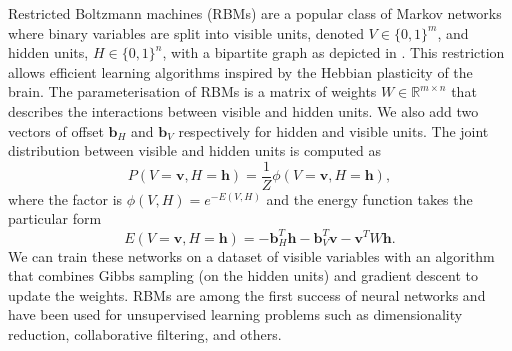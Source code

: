 Restricted Boltzmann machines (RBMs) are a popular class of Markov networks where binary variables are split into visible units, denoted $V \in \{0, 1\}^m$, and hidden units, $H \in \{0, 1\}^n$, with a bipartite graph as depicted in . This restriction allows efficient learning algorithms inspired by the Hebbian plasticity of the brain. The parameterisation of RBMs is a matrix of weights $W \in \mathbb{R}^{m\times n}$ that describes the interactions between visible and hidden units. We also add two vectors of offset $\bm{b}_H$ and $\bm{b}_V$ respectively for hidden and visible units. The joint distribution between visible and hidden units is computed as
$$ P(V=\bm{v}, H=\bm{h}) = \frac{1}{Z} \phi(V=\bm{v}, H=\bm{h}), $$
where the factor is $ \phi(V, H)=e^{-E(V, H)} $ and the energy function takes the particular form
$$ E(V=\bm{v}, H=\bm{h}) = -\bm{b}_H^T \bm{h} - \bm{b}_V^T \bm{v} - \bm{v}^T W \bm{h}.  $$
We can train these networks on a dataset of visible variables with an algorithm that combines Gibbs sampling (on the hidden units) and gradient descent to update the weights. RBMs are among the first success of neural networks and have been used for unsupervised learning problems such as dimensionality reduction, collaborative filtering, and others.
%
%
%

